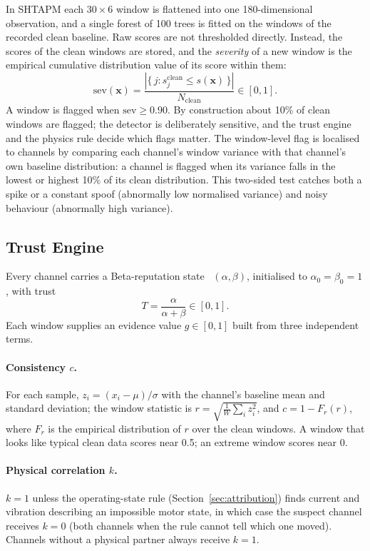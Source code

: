 In SHTAPM each $30 \times 6$ window is flattened into one 180-dimensional observation, and a single forest of 100 trees is fitted on the windows of the recorded clean baseline. Raw scores are not thresholded directly. Instead, the scores of the clean windows are stored, and the \emph{severity} of a new window is the empirical cumulative distribution value of its score within them:
\begin{equation}
\mathrm{sev}(\mathbf{x}) = \frac{\left|\{\, j : s_j^{\mathrm{clean}} \leq s(\mathbf{x}) \,\}\right|}{N_{\mathrm{clean}}} \in [0, 1].
\end{equation}
A window is flagged when $\mathrm{sev} \geq 0.90$. By construction about 10\% of clean windows are flagged; the detector is deliberately sensitive, and the trust engine and the physics rule decide which flags matter. The window-level flag is localised to channels by comparing each channel's window variance with that channel's own baseline distribution: a channel is flagged when its variance falls in the lowest or highest 10\% of its clean distribution. This two-sided test catches both a spike or a constant spoof (abnormally low normalised variance) and noisy behaviour (abnormally high variance).

\subsection{Trust Engine}
\label{sec:trust}

Every channel carries a Beta-reputation state~\cite{josang2002beta} $(\alpha, \beta)$, initialised to $\alpha_0 = \beta_0 = 1$, with trust
\begin{equation}
T = \frac{\alpha}{\alpha + \beta} \in [0, 1].
\end{equation}
Each window supplies an evidence value $g \in [0, 1]$ built from three independent terms.

\paragraph{Consistency $c$.} For each sample, $z_i = (x_i - \mu)/\sigma$ with the channel's baseline mean and standard deviation; the window statistic is $r = \sqrt{\tfrac{1}{W}\sum_i z_i^2}$, and $c = 1 - F_r(r)$, where $F_r$ is the empirical distribution of $r$ over the clean windows. A window that looks like typical clean data scores near 0.5; an extreme window scores near 0.

\paragraph{Physical correlation $k$.} $k = 1$ unless the operating-state rule (Section~\ref{sec:attribution}) finds current and vibration describing an impossible motor state, in which case the suspect channel receives $k = 0$ (both channels when the rule cannot tell which one moved). Channels without a physical partner always receive $k = 1$.

